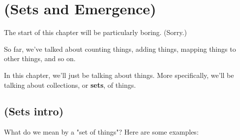 


\chapter{(Sets and Emergence)}


The start of this chapter will be particularly boring. (Sorry.)

So far, we've talked about counting things, adding things, mapping things to other things, and so on.

In this chapter, we'll just be talking about things. More specifically, we'll be talking about collections, or \textbf{sets}, of things.


\section{(Sets intro)}

What do we mean by a "set of things"? Here are some examples:

